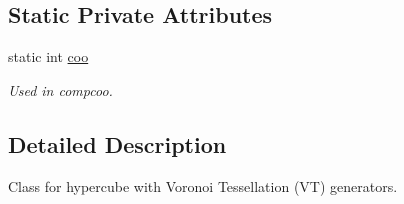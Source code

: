 \subsection*{Static Private Attributes}
\begin{DoxyCompactItemize}
\item 
static int \hyperlink{class_c_hypercube_aca37fbb8699607d3d7f69081fbb4cf31}{coo}
\begin{DoxyCompactList}\small\item\em Used in compcoo. \end{DoxyCompactList}\end{DoxyCompactItemize}


\subsection{Detailed Description}
Class for hypercube with Voronoi Tessellation (V\-T) generators. 

